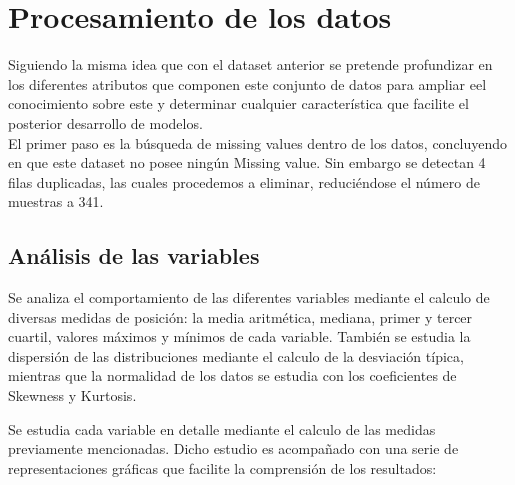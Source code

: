 \section{Procesamiento de los datos}
Siguiendo la misma idea que con el dataset anterior se pretende profundizar en los diferentes atributos que componen este conjunto de datos para ampliar eel conocimiento sobre este y determinar cualquier característica que facilite el posterior desarrollo de modelos. \\

El primer paso es la búsqueda de missing values dentro de los datos, concluyendo en que este dataset no posee ningún Missing value.
Sin embargo se detectan 4 filas duplicadas, las cuales procedemos a eliminar, reduciéndose el número de muestras a 341.





\subsection{Análisis de las variables}
Se analiza el comportamiento de las diferentes variables mediante el calculo de diversas medidas de posición: la media aritmética, mediana, primer y tercer cuartil, valores máximos y mínimos de cada variable. También se estudia la dispersión de las distribuciones mediante el calculo  de la desviación típica, mientras que la normalidad de los datos se estudia con los coeficientes de Skewness y Kurtosis.

Se estudia cada variable en detalle mediante el calculo de las medidas previamente mencionadas. Dicho estudio es acompañado con una serie de representaciones gráficas que facilite la comprensión de los resultados:

